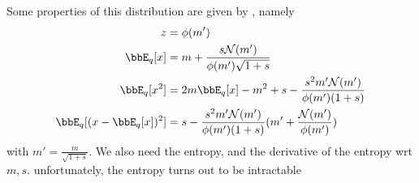 \documentclass[twoside]{article}
\begin{document}
Some properties of this distribution are given by \cite{rasmussen2006gaussian}, namely
\begin{equation*}
	\begin{split}
		z &= \phi(m')\\
		\bbE_q[x] &= m + \frac{s \mathcal N(m')}{\phi(m')\sqrt{1+s}}\\
		\bbE_q[x^2] &= 2m\bbE_q[x] - m^2 + s - \frac{s^2 m' \mathcal N(m')}{\phi(m')(1+s)}\\
		\bbE_q[(x-\bbE_q[x])^2] &= s - \frac{s^2 m' \mathcal N(m')}{\phi(m')(1+s)}(m' + \frac{\mathcal N(m')}{\phi(m')})
	\end{split}
\end{equation*}
with $m' = \frac{m}{\sqrt{1+s}}$. We also need the entropy, and the derivative of the entropy wrt $m,s$. unfortunately, the entropy turns out to be intractable
\end{document}
